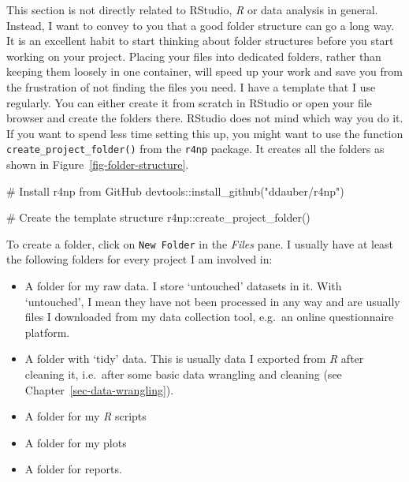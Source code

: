 \documentclass[
  letterpaper,
  DIV=11,
  numbers=noendperiod]{scrreprt}
\newenvironment{Shaded}{\begin{snugshade}}{\end{snugshade}}
\newcommand{\CommentTok}[1]{\textcolor[rgb]{0.37,0.37,0.37}{#1}}
\newcommand{\FunctionTok}[1]{\textcolor[rgb]{0.28,0.35,0.67}{#1}}
\newcommand{\NormalTok}[1]{\textcolor[rgb]{0.00,0.23,0.31}{#1}}
\newcommand{\SpecialCharTok}[1]{\textcolor[rgb]{0.37,0.37,0.37}{#1}}
\newcommand{\StringTok}[1]{\textcolor[rgb]{0.13,0.47,0.30}{#1}}
\begin{document}
This section is not directly related to RStudio, \emph{R} or data
analysis in general. Instead, I want to convey to you that a good folder
structure can go a long way. It is an excellent habit to start thinking
about folder structures before you start working on your project.
Placing your files into dedicated folders, rather than keeping them
loosely in one container, will speed up your work and save you from the
frustration of not finding the files you need. I have a template that I
use regularly. You can either create it from scratch in RStudio or open
your file browser and create the folders there. RStudio does not mind
which way you do it. If you want to spend less time setting this up, you
might want to use the function \texttt{create\_project\_folder()} from
the \texttt{r4np} package. It creates all the folders as shown in
Figure~\ref{fig-folder-structure}.

\begin{Shaded}
\begin{Highlighting}[]
\CommentTok{\# Install \textquotesingle{}r4np\textquotesingle{} from GitHub}
\NormalTok{devtools}\SpecialCharTok{::}\FunctionTok{install\_github}\NormalTok{(}\StringTok{"ddauber/r4np"}\NormalTok{)}

\CommentTok{\# Create the template structure}
\NormalTok{r4np}\SpecialCharTok{::}\FunctionTok{create\_project\_folder}\NormalTok{()}
\end{Highlighting}
\end{Shaded}

To create a folder, click on \texttt{New\ Folder} in the \emph{Files}
pane. I usually have at least the following folders for every project I
am involved in:

\begin{itemize}
\item
  A folder for my raw data. I store `untouched' datasets in it. With
  `untouched', I mean they have not been processed in any way and are
  usually files I downloaded from my data collection tool, e.g.~an
  online questionnaire platform.
\item
  A folder with `tidy' data. This is usually data I exported from
  \emph{R} after cleaning it, i.e.~after some basic data wrangling and
  cleaning (see Chapter~\ref{sec-data-wrangling}).
\item
  A folder for my \emph{R} scripts
\item
  A folder for my plots
\item
  A folder for reports.
\end{itemize}
\end{document}
